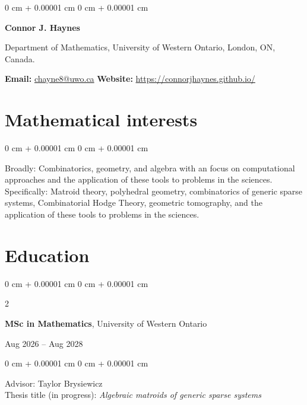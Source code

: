 \documentclass[10pt, letterpaper]{article}
\newenvironment{onecolentry}{
    \begin{adjustwidth}{
        0 cm + 0.00001 cm
    }{
        0 cm + 0.00001 cm
    }
}{
    \end{adjustwidth}
} %
\newenvironment{twocolentry}[2][]{
    \onecolentry
    \def\secondColumn{#2}
    \setcolumnwidth{\fill, 4.5 cm}
    \begin{paracol}{2}
}{
    \switchcolumn \raggedleft \secondColumn
    \end{paracol}
    \endonecolentry
} %
\let\hrefWithoutArrow\href
\begin{document}
    \newcommand{\AND}{\unskip
        \cleaders\copy\ANDbox\hskip\wd\ANDbox
        \ignorespaces
    }
    \newsavebox\ANDbox
    \sbox\ANDbox{$|$}

    \begin{onecolentry}
        \fontsize{25 pt}{25 pt}\selectfont \textbf{Connor J. Haynes}

        \vspace{5 pt}

        \normalsize Department of Mathematics, University of Western Ontario, London, ON, Canada.

        \vspace{2 pt}

        \textbf{Email:} \hrefWithoutArrow{mailto:chayne8@uwo.ca}{chayne8@uwo.ca}
        \hspace{10 pt}
        \textbf{Website:} \hrefWithoutArrow{https://connorjhaynes.github.io/}{https://connorjhaynes.github.io/}
    \end{onecolentry}

    \vspace{5 pt - 0.3 cm}

    \section{Mathematical interests}
        \begin{onecolentry}
          Broadly: Combinatorics, geometry, and algebra with an focus on computational approaches and the application of these tools to problems in the sciences.\\
          \vspace{0.1cm}
          Specifically: Matroid theory, polyhedral geometry, combinatorics of generic sparse systems, Combinatorial Hodge Theory, geometric tomography, and the application of these tools to problems in the sciences.
        \end{onecolentry}

    \section{Education}
        \begin{twocolentry}{
            Aug 2026 – Aug 2028
        }
            \textbf{MSc in Mathematics}, University of Western Ontario
        \end{twocolentry}
        \vspace{0.1cm}
        \begin{onecolentry}
            Advisor: Taylor Brysiewicz\\
            Thesis title (in progress): \emph{Algebraic matroids of generic sparse systems}
        \end{onecolentry}
        \vspace{0.2cm}
\end{document}
